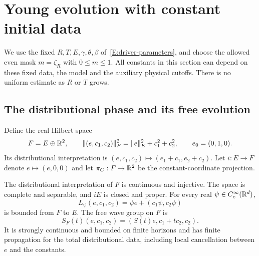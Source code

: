 \section{Young evolution with constant initial data}
\label{S:constant-phase-young}

We use the fixed $R,T,E,\gamma,\theta,\beta$ of~\eqref{E:driver-parameters}, and
choose the allowed even mask $m = \zeta_R$ with $0 \le m \le 1$. All constants
in this section can depend on these fixed data, the model and the auxiliary
physical cutoffs. There is no uniform estimate as $R$ or $T$ grows.

\subsection{The distributional phase and its free evolution}

Define the real Hilbert space
\begin{equation}\label{E:constant-phase-space}
  F=E\oplus\mathbb{R}^2,\qquad
  \|(e,c_1,c_2)\|_F^2=\|e\|_E^2+c_1^2+c_2^2,\qquad
  e_0=(0,1,0).
\end{equation}
Its distributional interpretation is $(e,c_1,c_2)\mapsto(e_1+c_1,e_2+c_2)$. Let
$i:E \to F$ denote $e\mapsto(e,0,0)$ and let $\pi_C:F \to \mathbb{R}^2$ be the
constant-coordinate projection.

\begin{lemma}\label{L:constant-phase-free}
  The distributional interpretation of $F$ is continuous and injective. The
  space is complete and separable, and $iE$ is closed and proper. For every real
  $\psi \in C_c^\infty(\mathbb{R}^d)$,
  \begin{equation}\label{E:constant-phase-cutoff}
    L_\psi(e,c_1,c_2)=\psi e+(c_1\psi,c_2\psi)
  \end{equation}
  is bounded from $F$ to $E$. The free wave group on $F$ is
  \begin{equation}\label{E:constant-phase-free}
    S_F(t)(e,c_1,c_2)=(S(t)e,c_1+tc_2,c_2).
  \end{equation}
  It is strongly continuous and bounded on finite horizons and has finite
  propagation for the total distributional data, including local cancellation
  between $e$ and the constants.
\end{lemma}

